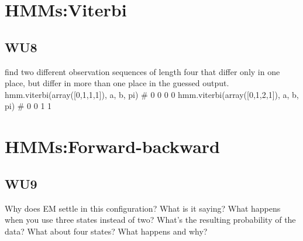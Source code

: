 \documentclass[a4paper,11pt]{article}
\begin{document}
\section{HMMs:Viterbi}
\subsection{WU8}
\textsf{find two different observation sequences of length four that
differ only in one place, but differ in more than one place in the
guessed output.}
hmm.viterbi(array([0,1,1,1]), a, b, pi) # 0 0 0 0
hmm.viterbi(array([0,1,2,1]), a, b, pi) # 0 0 1 1

\section{HMMs:Forward-backward}
\subsection{WU9}
\textsf{Why does EM settle in this configuration? What is it saying? What happens when you use three states instead of two? What's the resulting probability of the data? What about four states? What happens and why?}\\
\end{document}
